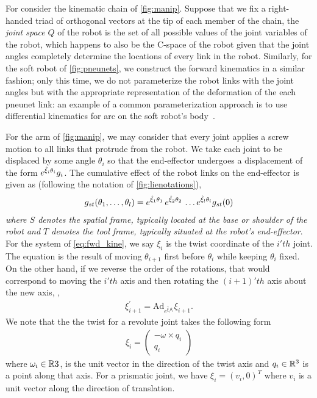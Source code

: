 For consider the kinematic chain of \autoref{fig:manip}. Suppose that we fix a right-handed triad of orthogonal vectors at the tip of each member of the chain, the\textit{ joint space} $Q$ of the robot is the set of all possible values of the joint variables of the robot, which happens to also be the C-space of the robot given that the joint angles completely determine the locations of every link in the robot. 
Similarly, for the soft robot of \autoref{fig:pneunets}, we construct the forward kinematics in a similar fashion; only this time, we do not parameterize the robot links with the joint angles but with the appropriate representation of the deformation of the each pneunet link: an example of a common parameterization approach is to use differential kinematics for arc on the soft robot's body~\cite{Hannan2003}.

For the arm of \autoref{fig:manip}, we may consider that every joint applies a screw motion to all links that protrude from the robot. We take each joint to be displaced by some angle $\theta_i$ so that the end-effector undergoes a displacement of the form $e^{\hat{\xi}_i \theta_i}g_i$. The cumulative effect of the robot links on the end-effector is given as (following the notation of \autoref{fig:lienotations}),
%
\begin{align}
g_{st}(\theta_1, \ldots, \theta_l) = e^{\hat{\xi}_1 \theta_1}\,e^{\hat{\xi}_2 \theta_2}  \, \ldots e^{\hat{\xi}_l \theta_l} g_{st}(0)
\label{eq:fwd_kine}
\end{align}
%
\textit{where $S$ denotes the spatial frame, typically located at the base or shoulder of the robot and $T$ denotes the tool frame, typically situated at the robot's end-effector}. For the system of \eqref{eq:fwd_kine}, we say $\xi_i$ is the twist coordinate of the $i'th$ joint. The equation is the result of moving $\theta_{i+1}$ first before $\theta_i$ while keeping $\theta_i$ fixed. On the other hand, if we reverse the order of the rotations, that would correspond to moving the $i'th$ axis and then rotating the $(i+1)'th$ axis about the new axis, \ie,
%
\begin{align}
	\xi_{i+1}^\prime = \text{Ad}_{e^{\hat{\xi}_i \theta_i}} \xi_{i+1}.
\end{align}
%
We note that the the twist for a revolute joint takes the following form
%
\begin{align}
	\xi_i = \left(\begin{array}{c}
	-\omega \times q_i \\ q_i
	\end{array}\right)
\end{align}
%
where $\omega_i \in \mathbb{R}3$, is the unit vector in the direction of the twist axis and $q_i \in \mathbb{R}^3$ is a point along that axis. For a prismatic joint, we have $\xi_i = (v_i, 0)^T$ where $v_i$ is a unit vector along the direction of translation.

